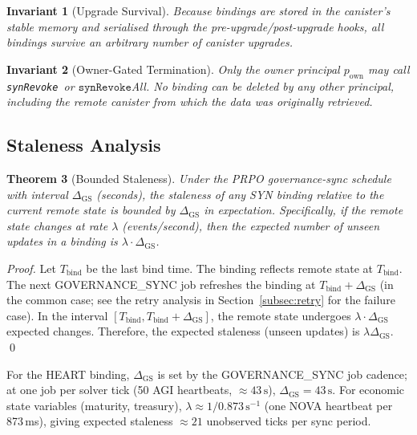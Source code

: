 \documentclass[12pt]{article}
\newtheorem{theorem}{Theorem}
\newtheorem{invariant}[theorem]{Invariant}
\newcommand{\synRevoke}{\texttt{synRevoke}}
\begin{document}
\begin{invariant}[Upgrade Survival]
  Because bindings are stored in the canister's stable memory and serialised
  through the pre-upgrade/post-upgrade hooks, all bindings survive an arbitrary
  number of canister upgrades.
\end{invariant}

\begin{invariant}[Owner-Gated Termination]
  Only the owner principal $p_\text{own}$ may call \synRevoke\ or
  $\synRevoke$All.  No binding can be deleted by any other principal, including
  the remote canister from which the data was originally retrieved.
\end{invariant}

\subsection{Staleness Analysis}

\begin{theorem}[Bounded Staleness]
  Under the PRPO governance-sync schedule with interval $\Delta_\text{GS}$
  (seconds), the staleness of any SYN binding relative to the current remote
  state is bounded by $\Delta_\text{GS}$ in expectation.  Specifically, if the
  remote state changes at rate $\lambda$ (events/second), then the expected
  number of unseen updates in a binding is $\lambda \cdot \Delta_\text{GS}$.
\end{theorem}

\begin{proof}
  Let $T_\text{bind}$ be the last bind time.  The binding reflects remote state
  at $T_\text{bind}$.  The next GOVERNANCE\_SYNC job refreshes the binding at
  $T_\text{bind} + \Delta_\text{GS}$ (in the common case; see the retry
  analysis in Section~\ref{subsec:retry} for the failure case).  In the
  interval $[T_\text{bind}, T_\text{bind} + \Delta_\text{GS}]$, the remote
  state undergoes $\lambda \cdot \Delta_\text{GS}$ expected changes.
  Therefore, the expected staleness (unseen updates) is $\lambda \Delta_\text{GS}$.
  \qed
\end{proof}

For the HEART binding, $\Delta_\text{GS}$ is set by the GOVERNANCE\_SYNC job
cadence; at one job per solver tick (50 AGI heartbeats, $\approx 43\,\text{s}$),
$\Delta_\text{GS} = 43\,\text{s}$.  For economic state variables (maturity,
treasury), $\lambda \approx 1/0.873\,\text{s}^{-1}$ (one NOVA heartbeat per 873\,ms),
giving expected staleness $\approx 21$ unobserved ticks per sync period.
\end{document}
